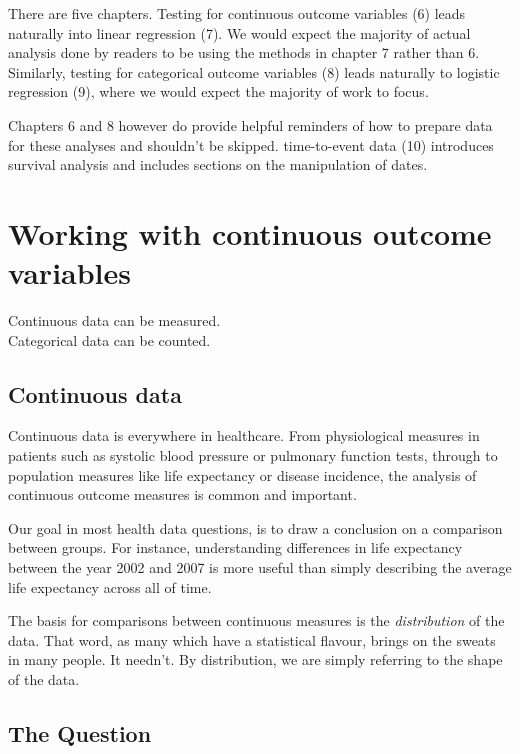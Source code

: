 \documentclass[
  12pt,
  krantz2]{krantz}
\renewenvironment{quote}{\begin{VF}}{\end{VF}}
\begin{document}
There are five chapters.
Testing for continuous outcome variables (6) leads naturally into linear regression (7).
We would expect the majority of actual analysis done by readers to be using the methods in chapter 7 rather than 6.
Similarly, testing for categorical outcome variables (8) leads naturally to logistic regression (9), where we would expect the majority of work to focus.

Chapters 6 and 8 however do provide helpful reminders of how to prepare data for these analyses and shouldn't be skipped.
time-to-event data (10) introduces survival analysis and includes sections on the manipulation of dates.

\hypertarget{chap06-h1}{%
\chapter{Working with continuous outcome variables}\label{chap06-h1}}


\begin{quote}
Continuous data can be measured.\\
Categorical data can be counted.
\end{quote}

\hypertarget{continuous-data}{%
\section{Continuous data}\label{continuous-data}}

Continuous data is everywhere in healthcare.
From physiological measures in patients such as systolic blood pressure or pulmonary function tests, through to population measures like life expectancy or disease incidence, the analysis of continuous outcome measures is common and important.

Our goal in most health data questions, is to draw a conclusion on a comparison between groups.
For instance, understanding differences in life expectancy between the year 2002 and 2007 is more useful than simply describing the average life expectancy across all of time.

The basis for comparisons between continuous measures is the \emph{distribution} of the data.
That word, as many which have a statistical flavour, brings on the sweats in many people.
It needn't.
By distribution, we are simply referring to the shape of the data.

\hypertarget{the-question}{%
\section{The Question}\label{the-question}}
\end{document}

